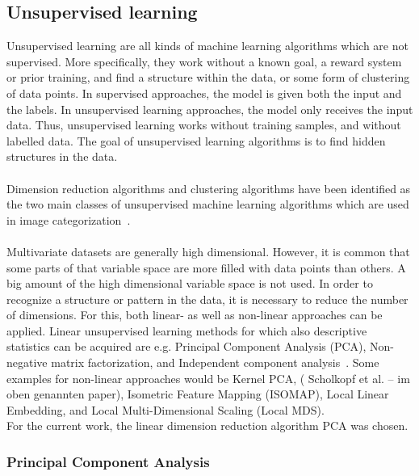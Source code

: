 \subsection{Unsupervised learning}
\label{sec:UnsupervisedLearning}

Unsupervised learning are all kinds of machine learning algorithms which are not supervised. More specifically, they work without a known goal, a reward system or prior training, and find a structure within the data, or some form of clustering of data points. In supervised approaches, the model is given both the input and the labels. In unsupervised learning approaches, the model only receives the input data. Thus, unsupervised learning works without training samples, and without labelled data. The goal of unsupervised learning algorithms is to find hidden structures in the data.  \\
\\
Dimension reduction algorithms and clustering algorithms have been identified as the two main classes of unsupervised machine learning algorithms which are used in image categorization~\citep{olaode2014}. \\
\\
Multivariate datasets are generally high dimensional. However, it is common that some parts of that variable space are more filled with data points than others. A big amount of the high dimensional variable space is not used. In order to recognize a structure or pattern in the data, it is necessary to reduce the number of dimensions. For this, both linear- as well as non-linear approaches can be applied. Linear unsupervised learning methods for which also descriptive statistics can be acquired are e.g. Principal Component Analysis (PCA), Non-negative matrix factorization, and Independent component analysis~\citep{olaode2014}. Some examples for non-linear approaches would be Kernel PCA,  ( Scholkopf  et  al. – im oben genannten paper),  Isometric  Feature  Mapping  (ISOMAP),  Local  Linear  Embedding,  and Local  Multi-Dimensional  Scaling  (Local  MDS). \\
For the current work, the linear dimension reduction algorithm PCA was chosen.


\subsubsection{Principal Component Analysis}
\label{subsec:PCA}

